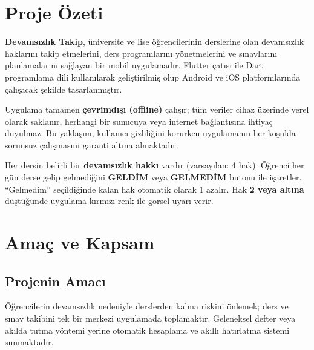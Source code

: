 \documentclass[12pt,a4paper]{article}
\begin{document}
\tableofcontents
\clearpage

\section{Proje Özeti}

\textbf{Devamsızlık Takip}, üniversite ve lise öğrencilerinin derslerine olan devamsızlık haklarını takip etmelerini, ders programlarını yönetmelerini ve sınavlarını planlamalarını sağlayan bir mobil uygulamadır. Flutter çatısı ile Dart programlama dili kullanılarak geliştirilmiş olup Android ve iOS platformlarında çalışacak şekilde tasarlanmıştır.

Uygulama tamamen \textbf{çevrimdışı (offline)} çalışır; tüm veriler cihaz üzerinde yerel olarak saklanır, herhangi bir sunucuya veya internet bağlantısına ihtiyaç duyulmaz. Bu yaklaşım, kullanıcı gizliliğini korurken uygulamanın her koşulda sorunsuz çalışmasını garanti altına almaktadır.

\begin{tcolorbox}[bilgikutusu, title={Temel İşleyiş Mantığı}]
Her dersin belirli bir \textbf{devamsızlık hakkı} vardır (varsayılan: 4 hak). Öğrenci her gün derse gelip gelmediğini \textbf{GELDİM} veya \textbf{GELMEDİM} butonu ile işaretler. ``Gelmedim'' seçildiğinde kalan hak otomatik olarak 1 azalır. Hak \textbf{2 veya altına} düştüğünde uygulama kırmızı renk ile görsel uyarı verir.
\end{tcolorbox}

\section{Amaç ve Kapsam}

\subsection{Projenin Amacı}

Öğrencilerin devamsızlık nedeniyle derslerden kalma riskini önlemek; ders ve sınav takibini tek bir merkezi uygulamada toplamaktır. Geleneksel defter veya akılda tutma yöntemi yerine otomatik hesaplama ve akıllı hatırlatma sistemi sunmaktadır.
\end{document}

